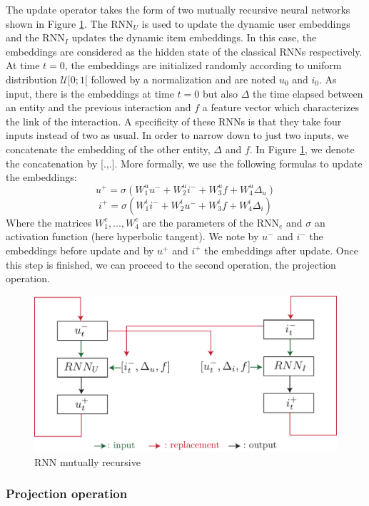 The update operator takes the form of two mutually recursive neural networks shown in Figure \ref{recursive RNNs}. The RNN$_U$ is used to update the dynamic user embeddings and the RNN$_I$ updates the dynamic item embeddings. In this case, the embeddings are considered as the hidden state of the classical RNNs respectively. At time $t=0$, the embeddings are initialized randomly according to uniform distribution $\mathcal{U}[0;1[$ followed by a normalization and are noted $u_0$ and $i_0$. As input, there is the embeddings at time $t=0$ but also $\Delta$ the time elapsed between an entity and the previous interaction and $f$ a feature vector which characterizes the link of the interaction. A specificity of these RNNs is that they take four inputs instead of two as usual. In order to narrow down to just two inputs, we concatenate the embedding of the other entity, $\Delta$ and $f$. In Figure \ref{recursive RNNs}, we denote the concatenation by [.,.]. More formally, we use the following formulas to update the embeddings:
$$
u^+ = \sigma \left ( W_1^u u^- + W_2^u i^- + W_3^u f + W_4^u \Delta_u \right )
$$
$$
i^+ = \sigma \left ( W_1^i i^- + W_2^i u^- + W_3^i f + W_4^i \Delta_i \right )
$$
Where the matrices $W_1^e, ..., W_4^e$ are the parameters of the RNN$_e$ and $\sigma$ an activation function (here hyperbolic tangent). We note by $u^-$ and $i^-$ the embeddings before update and by $u^+$ and $i^+$ the embeddings after update. Once this step is finished, we can proceed to the second operation, the projection operation.

\begin{figure}[H]
   \centering
    \includegraphics[width=1.0\textwidth]{image/rnn_jodie.pdf}
    \caption{RNN mutually recursive}
    \label{recursive RNNs}
\end{figure}

\subsubsection{Projection operation}

